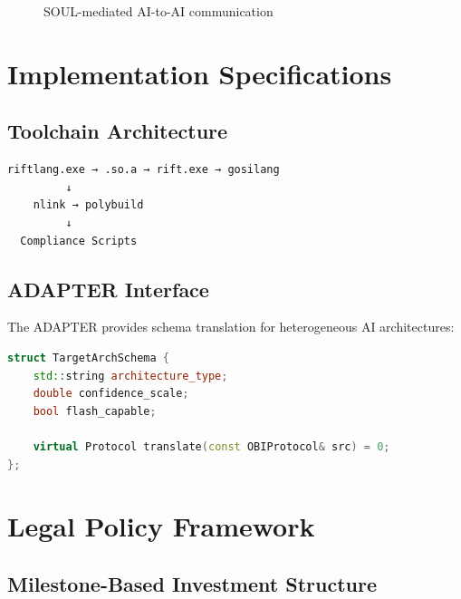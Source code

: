 \documentclass[11pt,a4paper]{article}
\begin{document}
\begin{figure}[h]
\centering
{}
\caption{SOUL-mediated AI-to-AI communication}
\end{figure}

\section{Implementation Specifications}

\subsection{Toolchain Architecture}

\begin{verbatim}
riftlang.exe → .so.a → rift.exe → gosilang
         ↓
    nlink → polybuild
         ↓
  Compliance Scripts
\end{verbatim}

\subsection{ADAPTER Interface}

The ADAPTER provides schema translation for heterogeneous AI architectures:

\begin{lstlisting}[language=C++, caption=ADAPTER Schema Definition]
struct TargetArchSchema {
    std::string architecture_type;
    double confidence_scale;
    bool flash_capable;
    
    virtual Protocol translate(const OBIProtocol& src) = 0;
};
\end{lstlisting}

\section{Legal Policy Framework}

\subsection{Milestone-Based Investment Structure}
\end{document}
